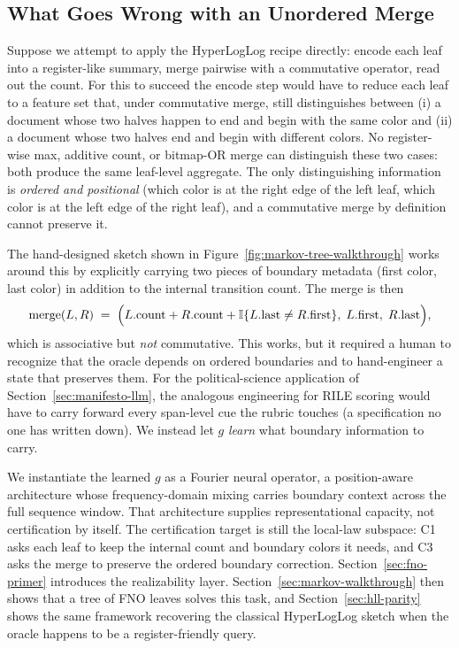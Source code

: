 \subsection{What Goes Wrong with an Unordered Merge}

Suppose we attempt to apply the HyperLogLog recipe directly: encode each
leaf into a register-like summary, merge pairwise with a commutative
operator, read out the count. For this to succeed the encode step would
have to reduce each leaf to a feature set that, under commutative merge,
still distinguishes between (i) a document whose two halves happen to end
and begin with the same color and (ii) a document whose two halves end
and begin with different colors. No register-wise max, additive count,
or bitmap-OR merge can distinguish these two cases: both produce the
same leaf-level aggregate. The only distinguishing information is
\emph{ordered and positional} (which color is at the right edge of the
left leaf, which color is at the left edge of the right leaf), and
a commutative merge by definition cannot preserve it.

The hand-designed sketch shown in Figure~\ref{fig:markov-tree-walkthrough}
works around this by explicitly carrying two pieces of boundary metadata
(first color, last color) in addition to the internal transition count.
The merge is then
\[
\text{merge}(L, R) \;=\; \Big(L.\text{count} + R.\text{count} + \mathbb{I}\{L.\text{last} \neq R.\text{first}\},\; L.\text{first},\; R.\text{last}\Big),
\]
which is associative but \emph{not} commutative. This works, but it
required a human to recognize that the oracle depends on ordered
boundaries and to hand-engineer a state that preserves them. For the
political-science application of Section~\ref{sec:manifesto-llm}, the
analogous engineering for RILE scoring would have to carry forward every
span-level cue the rubric touches (a specification no one has written
down). We instead let $g$ \emph{learn} what boundary information to carry.

We instantiate the learned $g$ as a Fourier neural operator, a position-aware architecture whose frequency-domain mixing carries boundary context across the full sequence window. That architecture supplies representational capacity, not certification by itself. The certification target is still the local-law subspace: C1 asks each leaf to keep the internal count and boundary colors it needs, and C3 asks the merge to preserve the ordered boundary correction. Section~\ref{sec:fno-primer} introduces the realizability layer. Section~\ref{sec:markov-walkthrough} then shows that a tree of FNO leaves solves this task, and Section~\ref{sec:hll-parity} shows the same framework recovering the classical HyperLogLog sketch when the oracle happens to be a register-friendly query.

